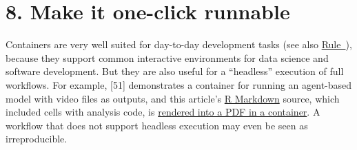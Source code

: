 \documentclass[10pt,letterpaper]{article}
\begin{document}
\hypertarget{make-it-one-click-runnable}{%
\section*{8. Make it one-click
runnable}\label{make-it-one-click-runnable}}

  \label{rule:interactive} 

Containers are very well suited for day-to-day development tasks (see
also \hyperref[{rule:usage}]{Rule~}), because they
support common interactive environments for data science and software
development. But they are also useful for a ``headless'' execution of
full workflows. For example, {[}51{]} demonstrates a container for
running an agent-based model with video files as outputs, and this
article's \href{https://rmarkdown.rstudio.com/}{R Markdown} source,
which included cells with analysis code, is
\href{https://github.com/nuest/ten-simple-rules-dockerfiles/blob/master/.travis.yml\#L18}{rendered
into a PDF in a container}. A workflow that does not support headless
execution may even be seen as irreproducible.
\end{document}
